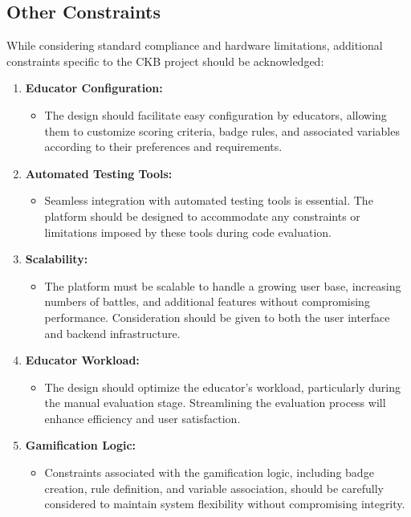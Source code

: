 \subsection{Other Constraints}
While considering standard compliance and hardware limitations, additional constraints specific to the CKB project should be acknowledged:

\begin{enumerate}
    \item \textbf{Educator Configuration:}
          \begin{itemize}
              \item The design should facilitate easy configuration by educators, allowing them to customize scoring criteria, badge rules, and associated variables according to their preferences and requirements.
          \end{itemize}

    \item \textbf{Automated Testing Tools:}
          \begin{itemize}
              \item Seamless integration with automated testing tools is essential. The platform should be designed to accommodate any constraints or limitations imposed by these tools during code evaluation.
          \end{itemize}

    \item \textbf{Scalability:}
          \begin{itemize}
              \item The platform must be scalable to handle a growing user base, increasing numbers of battles, and additional features without compromising performance. Consideration should be given to both the user interface and backend infrastructure.
          \end{itemize}

    \item \textbf{Educator Workload:}
          \begin{itemize}
              \item The design should optimize the educator's workload, particularly during the manual evaluation stage. Streamlining the evaluation process will enhance efficiency and user satisfaction.
          \end{itemize}

    \item \textbf{Gamification Logic:}
          \begin{itemize}
              \item Constraints associated with the gamification logic, including badge creation, rule definition, and variable association, should be carefully considered to maintain system flexibility without compromising integrity.
          \end{itemize}


\end{enumerate}

